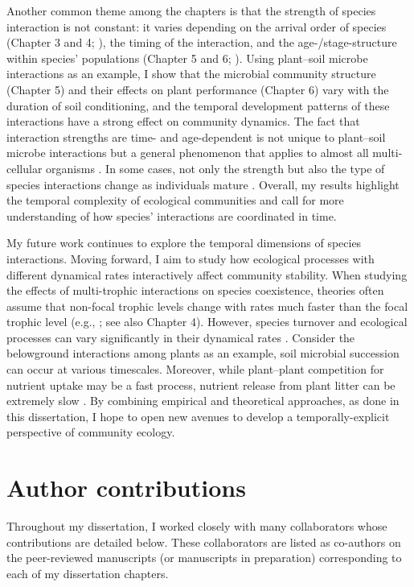 Another common theme among the chapters is that the strength of species interaction is not constant: it varies depending on the arrival order of species (Chapter 3 and 4; \citealp{Fukami2015, Duhamel2019}), the timing of the interaction, and the age-/stage-structure within species' populations (Chapter 5 and 6; \citealp{Kardol2013Oikos, Peay2018}). Using plant--soil microbe interactions as an example, I show that the microbial community structure (Chapter 5) and their effects on plant performance (Chapter 6) vary with the duration of soil conditioning, and the temporal development patterns of these interactions have a strong effect on community dynamics. The fact that interaction strengths are time- and age-dependent is not unique to plant--soil microbe interactions but a general phenomenon that applies to almost all multi-cellular organisms \citep{Miller2011, deRoos2013, Nakazawa2015}. In some cases, not only the strength but also the type of species interactions change as individuals mature \citep{Yang2010, KeNakazawa2018}. Overall, my results highlight the temporal complexity of ecological communities and call for more understanding of how species' interactions are coordinated in time.
\par


My future work continues to explore the temporal dimensions of species interactions. Moving forward, I aim to study how ecological processes with different dynamical rates interactively affect community stability. When studying the effects of multi-trophic interactions on species coexistence, theories often assume that non-focal trophic levels change with rates much faster than the focal trophic level (e.g., \citealp{Chesson2008}; see also Chapter 4). However, species turnover and ecological processes can vary significantly in their dynamical rates \citep{Rinaldi2000, Menge2012, LiChesson2016}. Consider the belowground interactions among plants as an example, soil microbial succession can occur at various timescales. Moreover, while plant--plant competition for nutrient uptake may be a fast process, nutrient release from plant litter can be extremely slow \citep{Menge2008}. By combining empirical and theoretical approaches, as done in this dissertation, I hope to open new avenues to develop a temporally-explicit perspective of community ecology.
\par



\section{Author contributions}
Throughout my dissertation, I worked closely with many collaborators whose contributions are detailed below. These collaborators are listed as co-authors on the peer-reviewed manuscripts (or manuscripts in preparation) corresponding to each of my dissertation chapters.
\par


